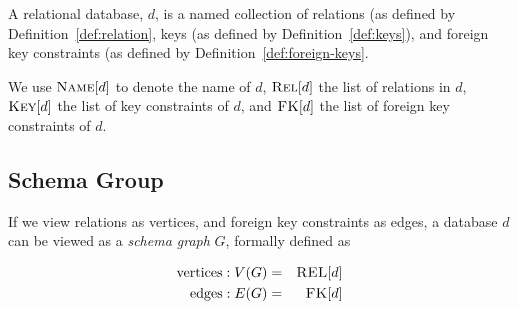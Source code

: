 	\begin{defn}
	\label{def:relational-database}
		A relational database, $d$, is a named collection of relations (as defined by Definition~\ref{def:relation}, keys (as defined by Definition~\ref{def:keys}), and foreign key constraints (as defined by Definition~\ref{def:foreign-keys}.
		
		We use $\textsc{Name}\lbrack d\rbrack$ to denote the name of $d$, $\textsc{Rel}\lbrack d\rbrack$ the list of relations in $d$, $\textsc{Key}\lbrack d\rbrack$ the list of key constraints of $d$, and $\textsc{FK}\lbrack d\rbrack$ the list of foreign key constraints of $d$.
	\end{defn}
	
	\subsection{Schema Group}
		\begin{defn}
			If we view relations as vertices, and foreign key constraints as edges, a database $d$ can be viewed as a \emph{schema graph} $G$, formally defined as
			
			\begin{eqnarray*}
				\mathrm{vertices}:  V(G) &=& \textsc{REL}\lbrack d\rbrack \\
				\mathrm{edges}:  E(G) &=& \textsc{FK}\lbrack d\rbrack
			\end{eqnarray*}
		\end{defn}
		
